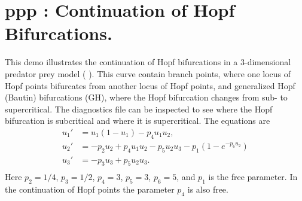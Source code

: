 \documentclass[12pt]{report}
\begin{document}
\section{ ppp :  Continuation of Hopf Bifurcations.} \label{sec:Demos_ppp}
This demo illustrates the continuation of Hopf bifurcations in a 3-dimensional 
predator prey model ( \citeyear{Do:84}).
This curve contain branch points, where one locus of Hopf points
bifurcates from another locus of Hopf points, and generalized Hopf (Bautin)
bifurcations (GH), where the Hopf bifurcation changes from sub- to
supercritical. The diagnostics file  can be inspected to
see where the Hopf bifurcation is subcritical and where it is supercritical.
The equations are
\begin{equation} \begin{array}{cl}
  u_1 ' &= u_1(1-u_1) - p_4 u_1 u_2  ,  \\
  u_2 ' &= -p_2 u_2 + p_4 u_1 u_2 - p_5 u_2 u_3
  -p_1(1-e^{-p_6 u_2}) \\
  u_3 ' &= -p_3 u_3  + p_5 u_2 u_3  .  \\  
\end{array} \end{equation}
Here $p_2=1/4$,  $p_3=1/2$,  $p_4=3$,  $p_5=3$,  $p_6=5$,
and $p_1$ is the free parameter.
In the continuation of Hopf points the parameter $p_4$
is also free.
\end{document}
